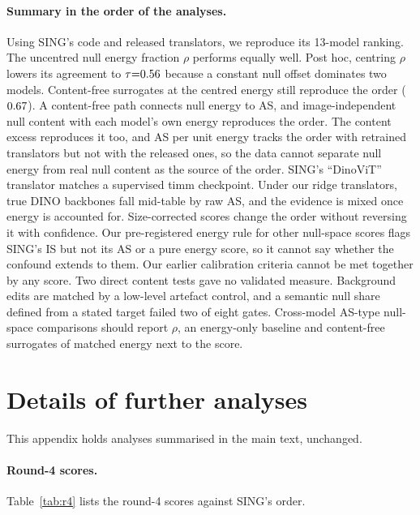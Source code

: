 \documentclass[10pt]{article}
\begin{document}
\paragraph{Summary in the order of the analyses.}
Using SING's code and released translators, we reproduce its 13-model ranking. The uncentred null energy fraction $\rho$ performs equally well. Post hoc, centring $\rho$ lowers its agreement to $\tau{=}0.56$ because a constant null offset dominates two models. Content-free surrogates at the centred energy still reproduce the order ($0.67$).
A content-free path connects null energy to AS, and image-independent null content with each model's own energy reproduces the order.
The content excess reproduces it too, and AS per unit energy tracks the order with retrained translators but not with the released ones, so the data cannot separate null energy from real null content as the source of the order.
SING's ``DinoViT'' translator matches a supervised timm checkpoint. Under our ridge translators, true DINO backbones fall mid-table by raw AS, and the evidence is mixed once energy is accounted for.
Size-corrected scores change the order without reversing it with confidence.
Our pre-registered energy rule for other null-space scores flags SING's IS but not its AS or a pure energy score, so it cannot say whether the confound extends to them.
Our earlier calibration criteria cannot be met together by any score. Two direct content tests gave no validated measure. Background edits are matched by a low-level artefact control, and a semantic null share defined from a stated target failed two of eight gates.
Cross-model AS-type null-space comparisons should report $\rho$, an energy-only baseline and content-free surrogates of matched energy next to the score.

\section{Details of further analyses}
\label{app:more}
This appendix holds analyses summarised in the main text, unchanged.
\paragraph{Round-4 scores.} Table~\ref{tab:r4} lists the round-4 scores against SING's order.
\begin{table}[t]
\centering\footnotesize

\caption{Round-4 scores against SING's order (Kendall $\tau$, percentile 95\% CI, 2000 model resamples). A1: AS after removing $\sqrt{\rho_0/\rho}\,\Pi f$ (\S\ref{sec:equal}); ridge: our retrained translators on the test half (\S\ref{sec:retrain}); AS$_{\mathrm{cperm}}$ and $\Delta_{\mathrm{align}}$: \S\ref{sec:cperm}; NCM$_{\mathrm{null}}$, NZS and $R$: \S\ref{sec:calib}; geometry and IS: \S\ref{sec:geom}.}
\label{tab:r4}
\end{table}
\end{document}
